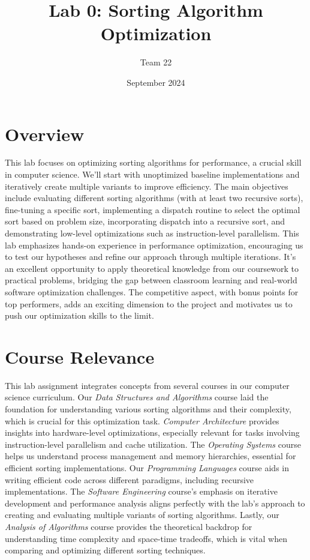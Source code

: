 \documentclass[twocolumn]{article}
\title{Lab 0: Sorting Algorithm Optimization}
\author{Team 22}
\date{September 2024}
\begin{document}
\maketitle

\section{Overview}
This lab focuses on optimizing sorting algorithms for performance, a crucial skill in computer science. We'll start with unoptimized baseline implementations and iteratively create multiple variants to improve efficiency. The main objectives include evaluating different sorting algorithms (with at least two recursive sorts), fine-tuning a specific sort, implementing a dispatch routine to select the optimal sort based on problem size, incorporating dispatch into a recursive sort, and demonstrating low-level optimizations such as instruction-level parallelism. This lab emphasizes hands-on experience in performance optimization, encouraging us to test our hypotheses and refine our approach through multiple iterations. It's an excellent opportunity to apply theoretical knowledge from our coursework to practical problems, bridging the gap between classroom learning and real-world software optimization challenges. The competitive aspect, with bonus points for top performers, adds an exciting dimension to the project and motivates us to push our optimization skills to the limit.

\section{Course Relevance}
This lab assignment integrates concepts from several courses in our computer science curriculum. Our \textit{Data Structures and Algorithms} course laid the foundation for understanding various sorting algorithms and their complexity, which is crucial for this optimization task. \textit{Computer Architecture} provides insights into hardware-level optimizations, especially relevant for tasks involving instruction-level parallelism and cache utilization. The \textit{Operating Systems} course helps us understand process management and memory hierarchies, essential for efficient sorting implementations. Our \textit{Programming Languages} course aids in writing efficient code across different paradigms, including recursive implementations. The \textit{Software Engineering} course's emphasis on iterative development and performance analysis aligns perfectly with the lab's approach to creating and evaluating multiple variants of sorting algorithms. Lastly, our \textit{Analysis of Algorithms} course provides the theoretical backdrop for understanding time complexity and space-time tradeoffs, which is vital when comparing and optimizing different sorting techniques.
\end{document}
